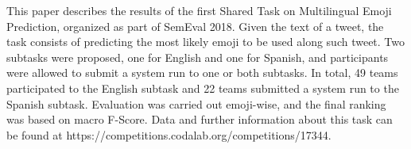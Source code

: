This paper describes the results of the first Shared Task on Multilingual Emoji Prediction, organized as part of SemEval 2018. Given the text of a tweet, the task consists of predicting the most likely emoji to be used along such tweet. Two subtasks were proposed, one for English and one for Spanish, and participants were allowed to submit a system run to one or both subtasks. In total, 49 teams participated to the English subtask and 22 teams submitted a system run to the Spanish subtask. Evaluation was carried out emoji-wise, and the final ranking was based on macro F-Score.  Data and further information about this task can be found at https://competitions.codalab.org/competitions/17344.
